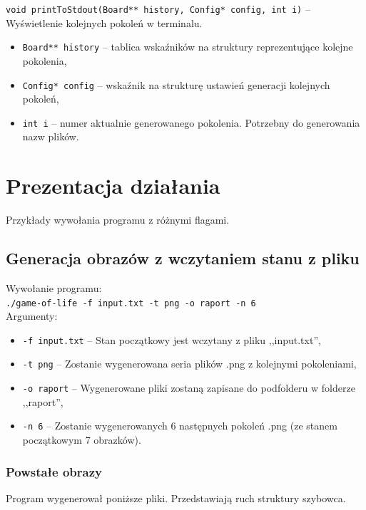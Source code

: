 \documentclass{mwart}
\begin{document}
\noindent{}\texttt{void printToStdout(Board** history, Config* config, int i)} -- Wyświetlenie kolejnych pokoleń w terminalu.
\begin{itemize}[label={}]
	\item\texttt{Board** history} -- tablica wskaźników na struktury reprezentujące kolejne pokolenia,
	\item\texttt{Config* config} -- wskaźnik na strukturę ustawień generacji kolejnych pokoleń,
	\item \texttt{int i} -- numer aktualnie generowanego pokolenia. Potrzebny do generowania nazw plików.
\end{itemize}

\section{Prezentacja działania}
Przykłady wywołania programu z różnymi flagami.

\subsection{Generacja obrazów z wczytaniem stanu z pliku}
\noindent{}Wywołanie programu: \\
\texttt{./game-of-life -f input.txt -t png -o raport -n 6} \\
Argumenty:
\begin{itemize}
\item \texttt{-f input.txt} -- Stan początkowy jest wczytany z pliku ,,input.txt'',
\item \texttt{-t png} -- Zostanie wygenerowana seria plików .png z kolejnymi pokoleniami,
\item \texttt{-o raport} -- Wygenerowane pliki zostaną zapisane do podfolderu w folderze ,,raport'',
\item \texttt{-n 6} -- Zostanie wygenerowanych 6 następnych pokoleń .png (ze stanem początkowym 7 obrazków).
\end{itemize}

\subsubsection*{Powstałe obrazy}
Program wygenerował poniższe pliki. Przedstawiają ruch struktury szybowca.
\end{document}
